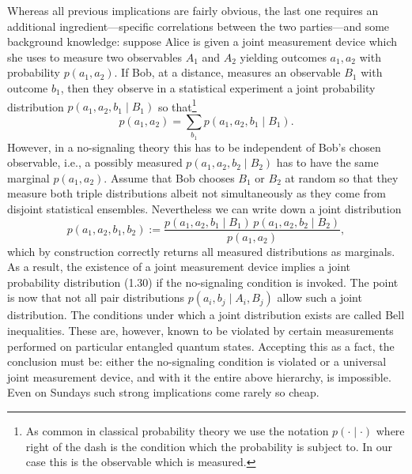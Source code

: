 \documentclass[11pt,a4paper]{article}
\theoremstyle{plain}
\theoremstyle{definition}
\theoremstyle{remark}
\numberwithin{equation}{section}
\begin{document}
Whereas all previous implications are fairly obvious, the last one requires an additional ingredient---specific correlations between the two parties---and some background knowledge: suppose Alice is given a joint measurement device which she uses to measure two observables $A_1$ and $A_2$ yielding outcomes $a_1,a_2$ with probability $p(a_1,a_2)$. If Bob, at a distance, measures an observable $B_1$ with outcome $b_1$, then they observe in a statistical experiment a joint probability distribution $p(a_1,a_2,b_1\mid B_1)$ so that\footnote{As common in classical probability theory we use the notation $p(\cdot\mid\cdot)$ where right of the dash is the condition which the probability is subject to. In our case this is the observable which is measured.}
\begin{equation}
    p(a_1,a_2)=\sum_{b_1} p(a_1,a_2,b_1\mid B_1).
\end{equation}
However, in a no-signaling theory this has to be independent of Bob's chosen observable, i.e., a possibly measured $p(a_1,a_2,b_2\mid B_2)$ has to have the same marginal $p(a_1,a_2)$. Assume that Bob chooses $B_1$ or $B_2$ at random so that they measure both triple distributions albeit not simultaneously as they come from disjoint statistical ensembles. Nevertheless we can write down a joint distribution
\begin{equation}
    p(a_1,a_2,b_1,b_2)
    := \frac{p(a_1,a_2,b_1\mid B_1)\,p(a_1,a_2,b_2\mid B_2)}{p(a_1,a_2)} ,
\end{equation}
which by construction correctly returns all measured distributions as marginals. As a result, the existence of a joint measurement device implies a joint probability distribution (1.30) if the no-signaling condition is invoked. The point is now that not all pair distributions $p(a_i,b_j\mid A_i,B_j)$ allow such a joint distribution. The conditions under which a joint distribution exists are called Bell inequalities. These are, however, known to be violated by certain measurements performed on particular entangled quantum states. Accepting this as a fact, the conclusion must be: either the no-signaling condition is violated or a universal joint measurement device, and with it the entire above hierarchy, is impossible. Even on Sundays such strong implications come rarely so cheap.
\end{document}
